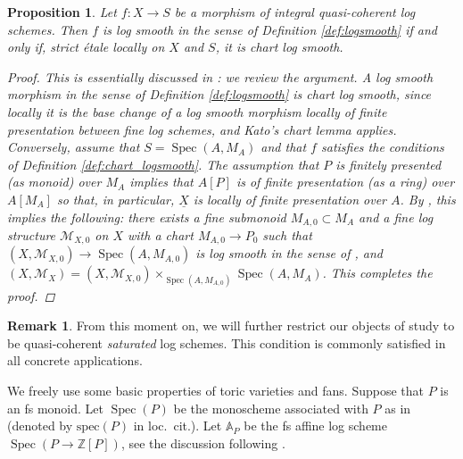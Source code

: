 \documentclass[11pt, a4paper]{amsart}
\newtheorem{prop}[thm]{Proposition}
\theoremstyle{definition}
\newtheorem{rmk}[thm]{Remark}
\numberwithin{equation}{subsection}
\newcommand{\Z}{\mathbb{Z}}
\newcommand{\A}{\mathbb{A}}
\providecommand{\Spec}[1]{\operatorname{Spec}(#1)} 	%
\begin{document}
     \begin{prop}Let $f\colon X\to S$ be a morphism of integral quasi-coherent log schemes. Then $f$ is log smooth in the sense of Definition \ref{def:logsmooth} if and only if, strict \'etale locally on $X$ and $S$, it is chart log smooth.
     \begin{proof} This is essentially discussed in \cite{Koshikawa}: we review the argument. A log smooth morphism in the sense of Definition \ref{def:logsmooth} is chart log smooth, since locally it is the base change of a log smooth morphism locally of finite presentation between fine log schemes, and Kato's chart lemma applies. Conversely, assume that $S= \Spec{A,M_A}$ and that $f$ satisfies the conditions of Definition \ref{def:chart_logsmooth}. 
     The assumption that $P$ is finitely presented (as monoid) over $M_A$ implies that $A[P]$ is of finite presentation (as a ring) over $A[M_A]$ so that, in particular, $\underline{X}$ is locally of finite presentation over $A$. By \cite[Proposition A.15]{Koshikawa}, this implies the following: there exists a \emph{fine} submonoid $M_{A,0} \subset M_A$ and a fine log structure $\mathcal{M}_{X,0}$ on $X$ with a chart $M_{A,0} \to P_0$ such that $(X, \mathcal{M}_{X,0}) \to \Spec{A, M_{A,0}}$ is log smooth in the sense of \cite[\S 3.3]{KatoLog}, and $(X, \mathcal{M}_X) = (X, \mathcal{M}_{X,0})\times_{\Spec{A, M_{A,0}}} \Spec{A, M_{A}}$. This completes the proof. \end{proof}
     \end{prop}

\begin{rmk}
    From this moment on, we will further restrict our objects of study to be quasi-coherent \emph{saturated} log schemes. This condition is commonly satisfied in all concrete applications.
\end{rmk}

We freely use some basic properties of toric varieties and fans. Suppose that $P$ is an fs monoid.
Let $\Spec{P}$ be the monoscheme associated with $P$ as in \cite[Definition II.1.2.1]{Ogu}
(denoted by $\mathrm{spec}(P)$ in loc.\ cit.).
Let $\A_P$ be the fs affine log scheme $\Spec{P\to \Z[P]}$, 
see the discussion following \cite[Definition III.1.2.3]{Ogu}.
\end{document}
